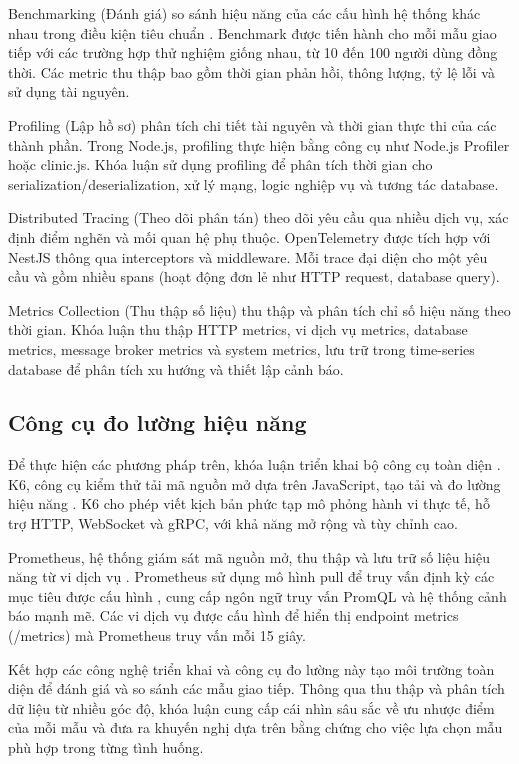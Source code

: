 Benchmarking (Đánh giá) so sánh hiệu năng của các cấu hình hệ thống khác nhau trong điều kiện tiêu chuẩn \cite{richardson2019}. Benchmark được tiến hành cho mỗi mẫu giao tiếp với các trường hợp thử nghiệm giống nhau, từ 10 đến 100 người dùng đồng thời. Các metric thu thập bao gồm thời gian phản hồi, thông lượng, tỷ lệ lỗi và sử dụng tài nguyên.

Profiling (Lập hồ sơ) phân tích chi tiết tài nguyên và thời gian thực thi của các thành phần. Trong Node.js, profiling thực hiện bằng công cụ như Node.js Profiler hoặc clinic.js. Khóa luận sử dụng profiling để phân tích thời gian cho serialization/deserialization, xử lý mạng, logic nghiệp vụ và tương tác database.

Distributed Tracing (Theo dõi phân tán) theo dõi yêu cầu qua nhiều dịch vụ, xác định điểm nghẽn và mối quan hệ phụ thuộc. OpenTelemetry được tích hợp với NestJS thông qua interceptors và middleware. Mỗi trace đại diện cho một yêu cầu và gồm nhiều spans (hoạt động đơn lẻ như HTTP request, database query).

Metrics Collection (Thu thập số liệu) thu thập và phân tích chỉ số hiệu năng theo thời gian. Khóa luận thu thập HTTP metrics, vi dịch vụ metrics, database metrics, message broker metrics và system metrics, lưu trữ trong time-series database để phân tích xu hướng và thiết lập cảnh báo.

\subsection{Công cụ đo lường hiệu năng}
Để thực hiện các phương pháp trên, khóa luận triển khai bộ công cụ toàn diện \cite{aksakalli2021}. K6, công cụ kiểm thử tải mã nguồn mở dựa trên JavaScript, tạo tải và đo lường hiệu năng \cite{jun2018}. K6 cho phép viết kịch bản phức tạp mô phỏng hành vi thực tế, hỗ trợ HTTP, WebSocket và gRPC, với khả năng mở rộng và tùy chỉnh cao.

Prometheus, hệ thống giám sát mã nguồn mở, thu thập và lưu trữ số liệu hiệu năng từ vi dịch vụ \cite{richardson2019}. Prometheus sử dụng mô hình pull để truy vấn định kỳ các mục tiêu được cấu hình \cite{newman2015}, cung cấp ngôn ngữ truy vấn PromQL và hệ thống cảnh báo mạnh mẽ. Các vi dịch vụ được cấu hình để hiển thị endpoint metrics (/metrics) mà Prometheus truy vấn mỗi 15 giây.

Kết hợp các công nghệ triển khai và công cụ đo lường này tạo môi trường toàn diện để đánh giá và so sánh các mẫu giao tiếp. Thông qua thu thập và phân tích dữ liệu từ nhiều góc độ, khóa luận cung cấp cái nhìn sâu sắc về ưu nhược điểm của mỗi mẫu và đưa ra khuyến nghị dựa trên bằng chứng cho việc lựa chọn mẫu phù hợp trong từng tình huống.